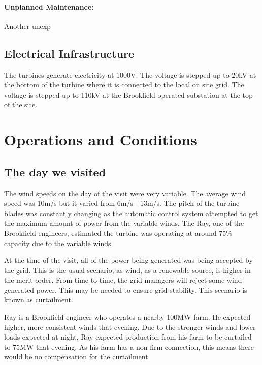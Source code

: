 \documentclass[12pt]{article} %
\begin{document}
\paragraph{Unplanned Maintenance:} 
Another unexp

\subsection{Electrical Infrastructure}
The turbines generate electricity at 1000V. The voltage is stepped up to 20kV at the bottom of the turbine where it is connected to the local on site grid. The voltage is stepped up to 110kV at the Brookfield operated substation at the top of the site.

\section{Operations and Conditions}


\subsection{The day we visited}
The wind speeds on the day of the visit were very variable. The average wind speed was 10m/s but it varied from 6m/s - 13m/s. The pitch of the turbine blades was constantly changing as the automatic control system attempted to get the maximum amount of power from the variable winds.
The Ray, one of the Brookfield engineers, estimated the turbine was operating at around 75\% capacity due to the variable winds

At the time of the visit, all of the power being generated was being accepted by the grid. This is the usual scenario, as wind, as a renewable source, is higher in the merit order. %
From time to time, the grid managers will reject some wind generated power. This may be needed to ensure grid stability. This scenario is known as curtailment.

Ray is a Brookfield engineer who operates a nearby 100MW farm.
He expected higher, more consistent winds that evening. Due to the stronger winds and lower loads expected at night, Ray expected production from his farm to be curtailed to 75MW that evening. As his farm has a non-firm connection, this means there would be no compensation for the curtailment.
\end{document}
